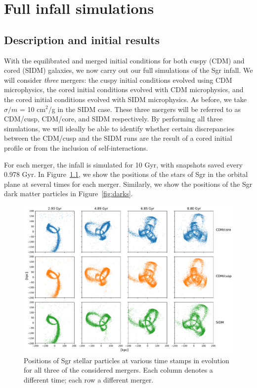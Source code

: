 \hypertarget{full-infall-simulations}{%
\chapter{Full infall simulations}\label{full-infall-simulations}}

\hypertarget{description-and-initial-results}{%
\section{Description and initial
results}\label{description-and-initial-results}}

With the equilibrated and merged initial conditions for both cuspy (CDM) and
cored (SIDM) galaxies, we now carry out our full simulations of the Sgr
infall.  We will consider \emph{three} mergers: the cuspy initial conditions
evolved using CDM microphysics, the cored initial conditions evolved with CDM
microphysics, and the cored initial conditions evolved with SIDM microphysics.
As before, we take \(\sigma / m\) = 10 cm\(^2\)/g in the SIDM case.  These
three mergers will be referred to as CDM/cusp, CDM/core, and SIDM
respectively.  By performing all three simulations, we will ideally be able to
identify whether certain discrepancies between the CDM/cusp and the SIDM runs
are the result of a cored initial profile or from the inclusion of
self-interactions.

For each merger, the infall is simulated for 10 Gyr, with snapshots saved
every 0.978 Gyr.  In Figure~\ref{fig:stars}, we show the positions of the
stars of Sgr in the orbital plane at several times for each merger.
Similarly, we show the positions of the Sgr dark matter particles in
Figure~\ref{fig:darks}.

\begin{figure}
    \centering
    \includegraphics[width=0.9\linewidth]{figs/stars.pdf}
    \caption{%
        Positions of Sgr stellar particles at various time stamps in evolution
        for all three of the considered mergers. Each column denotes a
        different time; each row a different merger.
    }
    \label{fig:stars}
\end{figure}

